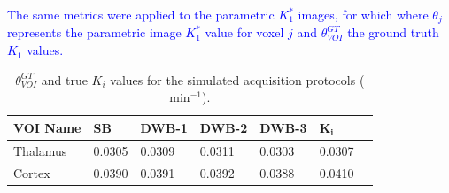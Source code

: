 \textcolor{blue}{The same metrics were applied to the parametric $K_1^*$ images, for which where $\theta_{j}$ represents the parametric image $K_1^*$ value for voxel $j$ and $\theta_{VOI}^{GT}$ the ground truth $K_1$ values.}

\begin{table}[h!]
\centering
\caption{\label{tab:GTvalues}$\theta_{VOI}^{GT}$ and true $K_i$ values for the simulated acquisition protocols ($\mathrm{min}^{-1}$).}
\begin{tabular}{lllllll}
\toprule
\textbf{VOI Name} & \textbf{SB} & \textbf{DWB-1} & \textbf{DWB-2} & \textbf{DWB-3} & {$\boldsymbol{K_i}$} \\
\midrule
Thalamus   & 0.0305 & 0.0309 & 0.0311 & 0.0303 & 0.0307\\
Cortex     & 0.0390 & 0.0391 & 0.0392 & 0.0388 & 0.0410\\
\toprule
\end{tabular}

\end{table}

